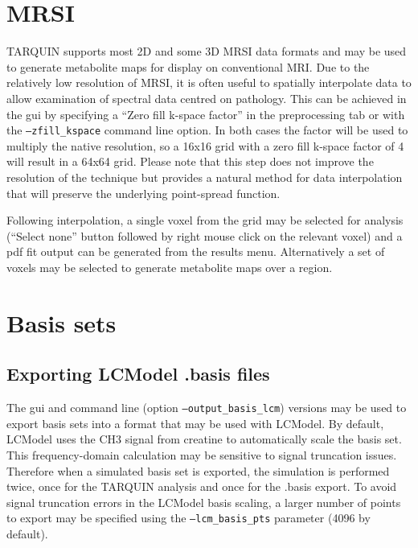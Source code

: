 \documentclass[a4paper,12pt]{article}
\begin{document}
\section{MRSI}
TARQUIN supports most 2D and some 3D MRSI data formats and may be used to generate metabolite maps for display on conventional MRI. Due to the relatively low resolution of MRSI, it is often useful to spatially interpolate data to allow examination of spectral data centred on pathology. This can be achieved in the gui by specifying a ``Zero fill k-space factor'' in the preprocessing tab or with the \texttt{---zfill\_kspace} command line option. In both cases the factor will be used to multiply the native resolution, so a 16x16 grid with a zero fill k-space factor of 4 will result in a 64x64 grid. Please note that this step does not improve the resolution of the technique but provides a natural method for data interpolation that will preserve the underlying point-spread function.

Following interpolation, a single voxel from the grid may be selected for analysis (``Select none'' button followed by right mouse click on the relevant voxel) and a pdf fit output can be generated from the results menu. Alternatively a set of voxels may be selected to generate metabolite maps over a region.


\section{Basis sets}

\subsection{Exporting LCModel .basis files}
The gui and command line (option \texttt{---output\_basis\_lcm}) versions may be used to export basis sets into a format that may be used with LCModel. By default, LCModel uses the CH3 signal from creatine to automatically scale the basis set. This frequency-domain calculation may be sensitive to signal truncation issues. Therefore when a simulated basis set is exported, the simulation is performed twice, once for the TARQUIN analysis and once for the .basis export. To avoid signal truncation errors in the LCModel basis scaling, a larger number of points to export may be specified using the \texttt{---lcm\_basis\_pts} parameter (4096 by default).
\end{document}

